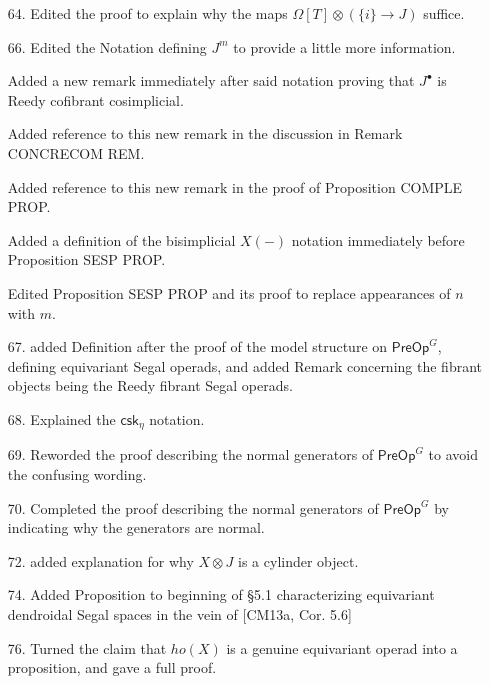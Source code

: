 \documentclass{article}
\begin{document}
\begin{itemize}
\item[64.] Edited the proof to explain why the maps $\Omega[T] \otimes (\{i\} \to J)$ suffice.

\item[66.] Edited the Notation defining $J^m$ to provide a little more information.

Added a new remark immediately after said notation proving that $J^{\bullet}$ is Reedy cofibrant cosimplicial.

Added reference to this new remark in the discussion in Remark CONCRECOM REM.

Added reference to this new remark in the proof of Proposition COMPLE PROP.

Added a definition of the bisimplicial $X(-)$ notation immediately before Proposition SESP PROP.

Edited Proposition SESP PROP and its proof to replace appearances of $n$ with $m$.

\item[67.] added Definition after the proof of the model structure on $\mathsf{PreOp}^G$, defining equivariant Segal operads,
and added Remark concerning the fibrant objects being the Reedy fibrant Segal operads.

\item[68.] Explained the $\mathsf{csk}_{\eta}$ notation.

\item[69.] Reworded the proof describing the normal generators of $\mathsf{PreOp}^G$ to avoid the confusing wording.

\item[70.] Completed the proof describing the normal generators of $\mathsf{PreOp}^G$ by indicating why the generators are normal.

\item[72.] added explanation for why $X \otimes J$ is a cylinder object.

\item[74.] Added Proposition to beginning of \S 5.1 characterizing equivariant dendroidal Segal spaces in the vein of [CM13a, Cor. 5.6]

\item[76.] Turned the claim that $ho(X)$ is a genuine equivariant operad into a proposition, and gave a full proof.


\end{itemize}
\end{document}
